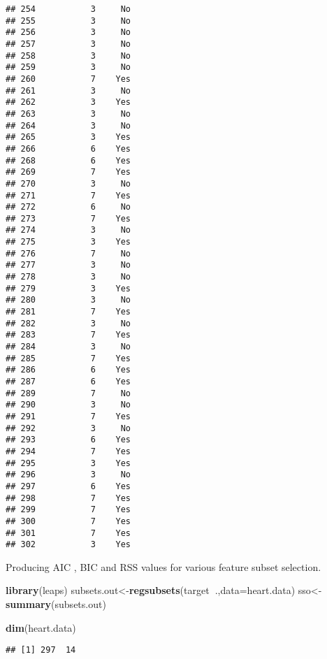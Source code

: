 \documentclass[]{article}
\newenvironment{Shaded}{\begin{snugshade}}{\end{snugshade}}
\newcommand{\DataTypeTok}[1]{\textcolor[rgb]{0.13,0.29,0.53}{#1}}
\newcommand{\DecValTok}[1]{\textcolor[rgb]{0.00,0.00,0.81}{#1}}
\newcommand{\KeywordTok}[1]{\textcolor[rgb]{0.13,0.29,0.53}{\textbf{#1}}}
\newcommand{\NormalTok}[1]{#1}
\newcommand{\OperatorTok}[1]{\textcolor[rgb]{0.81,0.36,0.00}{\textbf{#1}}}
\newcommand{\StringTok}[1]{\textcolor[rgb]{0.31,0.60,0.02}{#1}}
\begin{document}
\begin{verbatim}
## 254           3     No
## 255           3     No
## 256           3     No
## 257           3     No
## 258           3     No
## 259           3     No
## 260           7    Yes
## 261           3     No
## 262           3    Yes
## 263           3     No
## 264           3     No
## 265           3    Yes
## 266           6    Yes
## 268           6    Yes
## 269           7    Yes
## 270           3     No
## 271           7    Yes
## 272           6     No
## 273           7    Yes
## 274           3     No
## 275           3    Yes
## 276           7     No
## 277           3     No
## 278           3     No
## 279           3    Yes
## 280           3     No
## 281           7    Yes
## 282           3     No
## 283           7    Yes
## 284           3     No
## 285           7    Yes
## 286           6    Yes
## 287           6    Yes
## 289           7     No
## 290           3     No
## 291           7    Yes
## 292           3     No
## 293           6    Yes
## 294           7    Yes
## 295           3    Yes
## 296           3     No
## 297           6    Yes
## 298           7    Yes
## 299           7    Yes
## 300           7    Yes
## 301           7    Yes
## 302           3    Yes
\end{verbatim}

Producing AIC , BIC and RSS values for various feature subset selection.

\begin{Shaded}
\begin{Highlighting}[]
\KeywordTok{library}\NormalTok{(leaps)}
\NormalTok{subsets.out<-}\KeywordTok{regsubsets}\NormalTok{(target}\OperatorTok{~}\NormalTok{.,}\DataTypeTok{data=}\NormalTok{heart.data)}
\NormalTok{sso<-}\KeywordTok{summary}\NormalTok{(subsets.out)}

\KeywordTok{dim}\NormalTok{(heart.data)}
\end{Highlighting}
\end{Shaded}

\begin{verbatim}
## [1] 297  14
\end{verbatim}

\begin{Shaded}
\end{Shaded}
\end{document}
